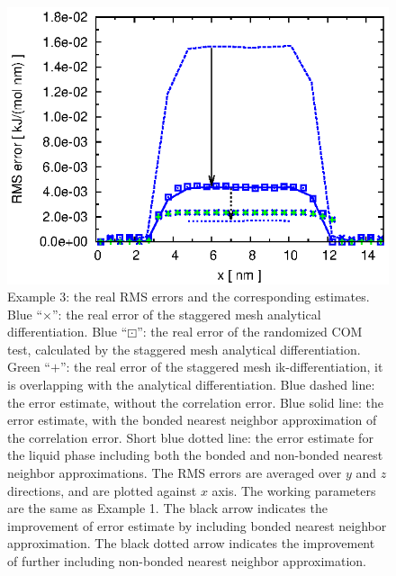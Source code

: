 \documentclass[journal=jacsat,manuscript=article]{achemso}
\newcommand{\recheck}[1]{{\color{black} #1}}
\begin{document}
\begin{figure}
  \centering
  \includegraphics[]{fig.water.ana.st.error.more.eps}
  \caption{
    Example 3: the real RMS errors and the corresponding
    estimates. 
    Blue ``$\times$'': the real error of the staggered mesh
    analytical differentiation.
    \recheck{
    Blue ``$\boxdot$'': the real error of the
    randomized COM test, calculated by
    the staggered mesh analytical differentiation.}
    Green ``$+$'': the real error of the staggered mesh
    ik-differentiation, it is overlapping with the analytical differentiation.
    Blue dashed line: the error estimate, without the correlation error.
    Blue solid line: the error estimate, with the \recheck{bonded} nearest
    neighbor approximation of the correlation error.
    \recheck{
      Short blue dotted line: the error estimate
    for the liquid phase including both the bonded and non-bonded
    nearest neighbor approximations.}
    The RMS errors are averaged over $y$ and $z$ directions, and are
    plotted against $x$ axis.
    The working parameters are the same as Example 1.
    The black arrow indicates the improvement
    of error estimate by including \recheck{bonded} nearest neighbor
    approximation.
    \recheck{
    The black dotted arrow indicates the improvement of
    further including non-bonded nearest neighbor approximation.}
  }   
  \label{fig:water-error}
\end{figure}
\end{document}
